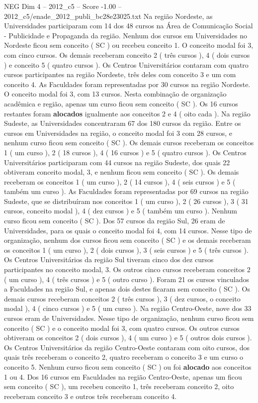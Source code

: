 \begin{textsample}{NEG Dim 4 – 2012\_c5 – Score -1.00 – 2012\_c5/enade\_2012\_publi\_bc28e23025.txt}
Na região Nordeste, as Universidades participaram com 14 dos 48 cursos na Área de Comunicação Social - Publicidade e Propaganda da região.
Nenhum dos cursos em Universidades no Nordeste ficou sem conceito ( SC ) ou recebeu conceito 1.
O conceito modal foi 3, com cinco cursos.
Os demais receberam conceito 2 ( três cursos ), 4 ( dois cursos ) e conceito 5 ( quatro cursos ).
Os Centros Universitários contaram com quatro cursos participantes na região Nordeste, três deles com conceito 3 e um com conceito 4.
As Faculdades foram representadas por 30 cursos na região Nordeste.
O conceito modal foi 3, com 13 cursos.
Nesta combinação de organização acadêmica e região, apenas um curso ficou sem conceito ( SC ).
Os 16 cursos restantes foram \textbf{alocados} igualmente aos conceitos 2 e 4 ( oito cada ).
Na região Sudeste, as Universidades concentraram 67 dos 180 cursos da região.
Entre os cursos em Universidades na região, o conceito modal foi 3 com 28 cursos, e nenhum curso ficou sem conceito ( SC ).
Os demais cursos receberam os conceitos 1 ( um curso ), 2 ( 18 cursos ), 4 ( 16 cursos ) e 5 ( quatro cursos ).
Os Centros Universitários participaram com 44 cursos na região Sudeste, dos quais 22 obtiveram conceito modal, 3, e nenhum ficou sem conceito ( SC ).
Os demais receberam os conceitos 1 ( um curso ), 2 ( 14 cursos ), 4 ( seis cursos ) e 5 ( também um curso ).
As Faculdades foram representadas por 69 cursos na região Sudeste, que se distribuíram nos conceitos 1 ( um curso ), 2 ( 26 cursos ), 3 ( 31 cursos, conceito modal ), 4 ( dez cursos ) e 5 ( também um curso ).
Nenhum curso ficou sem conceito ( SC ).
Dos 57 cursos da região Sul, 26 eram de Universidades, para os quais o conceito modal foi 4, com 14 cursos.
Nesse tipo de organização, nenhum dos cursos ficou sem conceito ( SC ) e os demais receberam os conceitos 1 ( um curso ), 2 ( dois cursos ), 3 ( seis cursos ) e 5 ( três cursos ).
Os Centros Universitários da região Sul tiveram cinco dos dez cursos participantes no conceito modal, 3.
Os outros cinco cursos receberam conceitos 2 ( um curso ), 4 ( três cursos ) e 5 ( outro curso ).
Foram 21 os cursos vinculados a Faculdades na região Sul, e apenas dois destes ficaram sem conceito ( SC ).
Os demais cursos receberam conceitos 2 ( três cursos ), 3 ( dez cursos, o conceito modal ), 4 ( cinco cursos ) e 5 ( um curso ).
Na região Centro-Oeste, nove dos 33 cursos eram de Universidades.
Nesse tipo de organização, nenhum curso ficou sem conceito ( SC ) e o conceito modal foi 3, com quatro cursos.
Os outros cursos obtiveram os conceitos 2 ( dois cursos ), 4 ( um curso ) e 5 ( outros dois cursos ).
Os Centros Universitários da região Centro-Oeste contaram com oito cursos, dos quais três receberam o conceito 2, quatro receberam o conceito 3 e um curso o conceito 5.
Nenhum curso ficou sem conceito ( SC ) ou foi \textbf{alocado} aos conceitos 1 ou 4.
Dos 16 cursos em Faculdades na região Centro-Oeste, apenas um ficou sem conceito ( SC ), um recebeu conceito 1, três receberam conceito 2, oito receberam conceito 3 e outros três receberam conceito 4.

\end{textsample}
